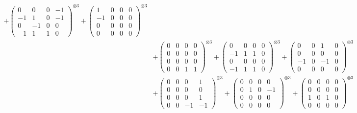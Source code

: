 \documentclass{article}
\begin{document}
{\begin{align}
            + \begin{pmatrix} 0 & 0 & 0 & -1 \\ -1 & 1 & 0 & -1 \\ 0 & -1 & 0 & 0 \\ -1 & 1 & 1 & 0 \end{pmatrix}^{\otimes 3} 
            + \begin{pmatrix} 1 & 0 & 0 & 0 \\ -1 & 0 & 0 & 0 \\ 0 & 0 & 0 & 0 \\ 0 & 0 & 0 & 0 \end{pmatrix}^{\otimes 3} \\
        &+ \label{Rs16-Rc11-Solution-14-c10} \begin{pmatrix} 0 & 0 & 0 & 0 \\ 0 & 0 & 0 & 0 \\ 0 & 0 & 0 & 0 \\ 0 & 0 & 1 & 1 \end{pmatrix}^{\otimes 3} 
            + \begin{pmatrix} 0 & 0 & 0 & 0 \\ -1 & 1 & 1 & 0 \\ 0 & 0 & 0 & 0 \\ -1 & 1 & 1 & 0 \end{pmatrix}^{\otimes 3} 
            + \begin{pmatrix} 0 & 0 & 1 & 0 \\ 0 & 0 & 0 & 0 \\ -1 & 0 & -1 & 0 \\ 0 & 0 & 0 & 0 \end{pmatrix}^{\otimes 3} \\
        &+ \label{Rs16-Rc11-Solution-14-c13} \begin{pmatrix} 0 & 0 & 0 & 1 \\ 0 & 0 & 0 & 0 \\ 0 & 0 & 0 & 1 \\ 0 & 0 & -1 & -1 \end{pmatrix}^{\otimes 3} 
            + \begin{pmatrix} 0 & 0 & 0 & 0 \\ 0 & 1 & 0 & -1 \\ 0 & 0 & 0 & 0 \\ 0 & 0 & 0 & 0 \end{pmatrix}^{\otimes 3} 
            + \begin{pmatrix} 0 & 0 & 0 & 0 \\ 0 & 0 & 0 & 0 \\ 1 & 0 & 1 & 0 \\ 0 & 0 & 0 & 0 \end{pmatrix}^{\otimes 3} \\

\end{align}}
\end{document}
